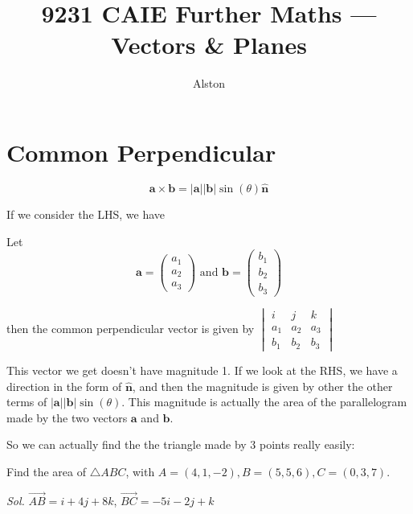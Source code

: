 \documentclass{article}
\title{9231 CAIE Further Maths — Vectors \& Planes}
\author{Alston}
\date{}
\theoremstyle{mytheoremstyle}
\theoremstyle{mytheoremstyle}
\theoremstyle{myproblemstyle}
\theoremstyle{myproblemstyle}
\begin{document}
    \maketitle
    \section{Common Perpendicular}

    \begin{definition}
        \[\mathbf{a} \times \mathbf{b} = |\mathbf{a}||\mathbf{b}| \sin(\theta) \hat{\mathbf{n}}\]
    \end{definition}

    If we consider the LHS, we have 
    
    \begin{theorem}
        Let
    $$ \mathbf{a} = \begin{pmatrix}
        a_1 \\ a_2 \\ a_3
    \end{pmatrix} \text{ and } \mathbf{b} = \begin{pmatrix}
        b_1 \\ b_2 \\ b_3
    \end{pmatrix}$$ 
    
    then the common perpendicular vector is given by $\begin{vmatrix}
        i & j & k \\ a_1 & a_2 & a_3 \\ b_1 & b_2 & b_3
    \end{vmatrix}$    
    \end{theorem}

    This vector we get doesn't have magnitude 1. If we look at the RHS, we have a direction in the form of $\hat{\mathbf{n}}$, and then the magnitude is given by other the other terms of $|\mathbf{a}||\mathbf{b}| \sin(\theta)$. This magnitude is actually the area of the parallelogram made by the two vectors $\mathbf{a}$ and $\mathbf{b}$.

    So we can actually find the the triangle made by 3 points really easily:
    
    \begin{example}
        Find the area of $\triangle ABC$, with $A = (4, 1, -2), B=(5, 5, 6), C=(0, 3, 7)$.
    \end{example}

    \textit{ Sol. } $\vec{AB} = i + 4j + 8k$, $\vec{BC} = -5i - 2j + k$
\end{document}
